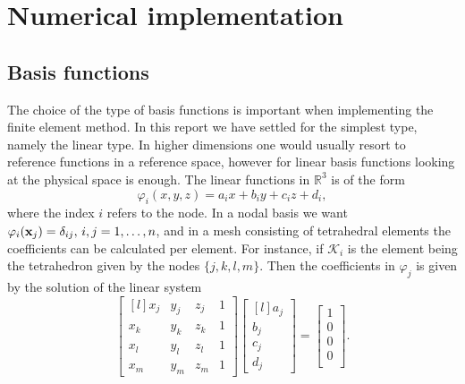 \section{Numerical implementation}
\subsection{Basis functions}
The choice of the type of basis functions is important when implementing the finite element method. In this report we have settled for the simplest type, namely the linear type. In higher dimensions one would usually resort to reference functions in a reference space, however for linear basis functions looking at the physical space is enough. The linear functions in $\mathbb{R}^3$ is of the form
\begin{equation}
	\varphi_i(x,y,z) = a_ix + b_iy + c_iz + d_i,
\end{equation}
where the index $i$ refers to the node. In a nodal basis we want $\varphi_i(\vb{x}_j) = \delta_{ij},\, i,j = 1,\dots,n$, and in a mesh consisting of tetrahedral elements the coefficients can be calculated per element. For instance, if $\mathcal{K}_i$ is the element being the tetrahedron given by the nodes $\{j,k,l,m\}$. Then the coefficients in $\varphi_j$ is given by the solution of the linear system
\begin{equation}
    \begin{bmatrix*}[l]
        x_j & y_j & z_j & 1 \\
        x_k & y_k & z_k & 1 \\
        x_l & y_l & z_l & 1 \\
        x_m & y_m & z_m & 1
     \end{bmatrix*}
     \begin{bmatrix*}[l]
        a_j \\
        b_j \\
        c_j \\
        d_j 
    \end{bmatrix*}
    =
    \begin{bmatrix}
        1 \\
        0 \\
        0 \\
        0 \\
    \end{bmatrix}.
    \label{eq:coeff_sys}
\end{equation}

